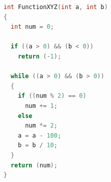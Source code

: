 \documentclass[11pt,a4paper]{article}
\begin{document}
\begin{table}[h!]
  \centering
  \begin{minipage}{0.59\textwidth}
    \centering

\begin{lstlisting}[language=C]
int FunctionXYZ(int a, int b)
{
  int num = 0;

  if ((a > 0) && (b < 0))
    return (-1);

  while ((a > 0) && (b > 0))
  {
    if ((num % 2) == 0)
      num += 1;
    else
      num *= 2;
    a = a - 100;
    b = b / 10;
  }
  return (num);
}
\end{lstlisting}

  \end{minipage}
  \hfillx
  \begin{minipage}{0.4\textwidth}
    \centering


\end{minipage}
\end{table}
\end{document}
